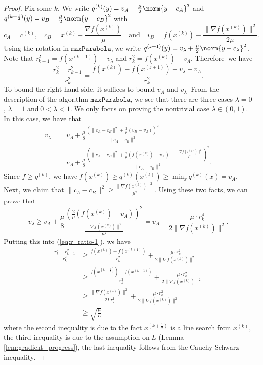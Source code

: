 \begin{proof}
Fix some $k$. We write $q^{(k)}(y)=v_{A}+\frac{\mu}{2}\norm{y-c_{A}}^{2}$
and $q^{(k+\frac{1}{2})}(y)=v_{B}+\frac{\mu}{2}\norm{y-c_{B}}^{2}$
with
\[
c_{A}=c^{(k)},\quad c_{B}=x^{(k)}-\frac{\nabla f(x^{(k)})}{\mu}\quad\text{and}\quad v_{B}=f(x^{(k)})-\frac{\|\nabla f(x^{(k)})\|^{2}}{2\mu}.
\]
Using the notation in $\mathtt{maxParabola}$, we write $q^{(k+1)}(y)=v_{\lambda}+\frac{\mu}{2}\norm{y-c_{\lambda}}^{2}$.
Note that $r_{k+1}^{2}=f(x^{(k+1)})-v_{\lambda}$ and $r_{k}^{2}=f(x^{(k)})-v_{A}$.
Therefore, we have
\begin{equation}
\frac{r_{k}^{2}-r_{k+1}^{2}}{r_{k}^{2}}=\frac{f(x^{(k)})-f(x^{(k+1)})+v_{\lambda}-v_{A}}{r_{k}^{2}}.\label{eq:r_ratio-1}
\end{equation}
To bound the right hand side, it suffices to bound $v_{A}$ and $v_{\lambda}$.
From the description of the algorithm $\mathtt{maxParabola}$, we
see that there are three cases $\lambda=0$, $\lambda=1$ and $0<\lambda<1$.
We only focus on proving the nontrivial case $\lambda\in(0,1)$. 
In this case, we have that
\begin{align*}
v_{\lambda} & =v_{A}+\frac{\mu}{8}\frac{(\|c_{A}-c_{B}\|^{2}+\frac{2}{\mu}(v_{B}-v_{A}))^{2}}{\|c_{A}-c_{B}\|^{2}}\\
 & =v_{A}+\frac{\mu}{8}\frac{(\|c_{A}-c_{B}\|^{2}+\frac{2}{\mu}(f(x^{(k)})-v_{A})-\frac{\|\nabla f(x^{(k)})\|^{2}}{\mu^{2}})^{2}}{\|c_{A}-c_{B}\|^{2}}.
\end{align*}
Since $f\geq q^{(k)}$, we have $f(x^{(k)})\geq q^{(k)}(x^{(k)})\geq\min_{x}q^{(k)}(x)=v_{A}$.
Next, we claim that $\|c_{A}-c_{B}\|^{2}\geq\frac{\|\nabla f(x^{(k)})\|^{2}}{\mu^{2}}$.
Using these two facts, we can prove that
\[
v_{\lambda}\geq v_{A}+\frac{\mu}{8}\frac{(\frac{2}{\mu}(f(x^{(k)})-v_{A}))^{2}}{\frac{\|\nabla f(x^{(k)})\|^{2}}{\mu^{2}}}=v_{A}+\frac{\mu\cdot r_{k}^{4}}{2\|\nabla f(x^{(k)})\|^{2}}.
\]
Putting this into (\ref{eq:r_ratio-1}), we have
\begin{align}
\frac{r_{k}^{2}-r_{k+1}^{2}}{r_{k}^{2}} & \geq\frac{f(x^{(k)})-f(x^{(k+1)})}{r_{k}^{2}}+\frac{\mu\cdot r_{k}^{2}}{2\|\nabla f(x^{(k)})\|^{2}}\nonumber \\
 & \geq\frac{f(x^{(k+\frac{1}{2})})-f(x^{(k+1)})}{r_{k}^{2}}+\frac{\mu\cdot r_{k}^{2}}{2\|\nabla f(x^{(k)})\|^{2}}\nonumber \\
 & \geq\frac{\|\nabla f(x^{(k)})\|^{2}}{2Lr_{k}^{2}}+\frac{\mu\cdot r_{k}^{2}}{2\|\nabla f(x^{(k)})\|^{2}}\label{eq:geometric_key-1}\\
 & \geq\sqrt{\frac{\mu}{L}}\nonumber 
\end{align}
where the second inequality is due to the fact $x^{(k+\frac{1}{2})}$
is a line search from $x^{(k)}$, the third inequality is due to the
assumption on $L$ (Lemma \ref{lem:gradient_progress}), the last
inequality follows from the Cauchy-Schwarz inequality.


\end{proof}
